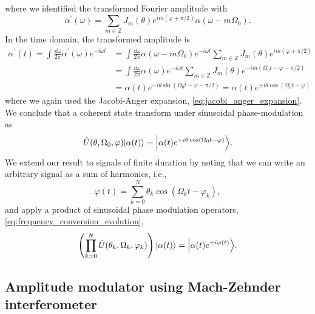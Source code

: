where we identified the transformed Fourier amplitude with
\begin{equation}
	\alpha^\prime(\omega)
	=
	\sum_{m\in\mathbb{Z}}
	J_m(\theta)
	e^{im(\varphi+\pi/2)}
	\alpha(\omega-m\Omega_0)
	.
\end{equation}
In the time domain, the transformed amplitude is
\begin{equation}
	\begin{split}
		\alpha^\prime(t)
		=
		\int\frac{\dd{\omega}}{2\pi}
		\alpha^\prime(\omega)
		e^{-i\omega t}
		&=
		\int\frac{\dd{\omega}}{2\pi}
		\alpha(\omega-m\Omega_0)
		e^{-i\omega t}
		\sum_{m\in\mathbb{Z}}
		J_m(\theta)
		e^{im(\varphi+\pi/2)}
		\\
		&=
		\int\frac{\dd{\omega}}{2\pi}
		\alpha(\omega)
		e^{-i\omega t}
		\sum_{m\in\mathbb{Z}}
		J_m(\theta)
		e^{-im(\Omega_0t-\varphi-\pi/2)}
		\\
		&=
		\alpha(t)
		e^{-i\theta\sin(\Omega_0t-\varphi-\pi/2)}
		=
		\alpha(t)
		e^{+i\theta\cos(\Omega_0t-\varphi)}
	\end{split}
\end{equation}
where we again used the Jacobi-Anger expansion, \cref{eq:jacobi_anger_expansion}.
We conclude that a coherent state transform under sinusoidal phase-modulation as
\begin{equation}
	\hat{U}(\theta,\Omega_0,\varphi)
	\ket*{\alpha(t)}
	=
	\ket*{\alpha(t)e^{+i\theta\cos(\Omega_0t-\varphi)}}
	.
\end{equation}
We extend our result to signals of finite duration by noting that we can write an arbitrary signal as a sum of harmonics, i.e.,
\begin{equation}
	\varphi(t)
	=
	\sum_{k=0}^N
	\theta_k
	\cos(\Omega_kt-\varphi_k)
	,
\end{equation}
and apply a product of sinusoidal phase modulation operators, \cref{eq:frequency_conversion_evolution},
\begin{equation}
	\left(
		\prod^N_{k=0}
		\hat{U}(\theta_k,\Omega_k,\varphi_k)
	\right)
	\ket*{\alpha(t)}
	=
	\ket*{\alpha(t)e^{+i\varphi(t)}}
	.
\end{equation}

\subsection{Amplitude modulator using Mach-Zehnder interferometer}

